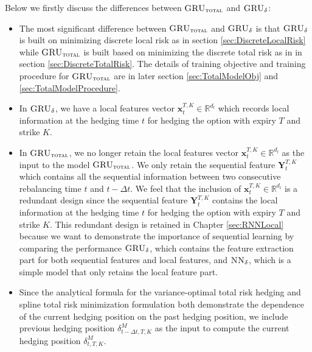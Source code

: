 \documentclass[letterpaper,12pt,titlepage,oneside,final]{book}
\numberwithin{equation}{section}
\theoremstyle{definition}
\newcommand{\model}{\textsc{GRU}_\delta}
\newcommand{\modelT}{\textsc{GRU}_{\textsc{total}}}
\newcommand{\modelN}{\textsc{NN}_\delta}
\newcommand{\vx}{\mathbf{x}}
\newcommand{\DT}{\Delta t}
\newcommand{\Real}{\mathbb{R}}
\begin{document}
Below we firstly discuss the differences between $\modelT$ and $\model$:
\begin{itemize}
	
	\item The most significant difference between  $\modelT$ and  $\model$ is that $\model$ is built on minimizing discrete local risk as in section \ref{sec:DiscreteLocalRisk} while $\modelT$ is built based on minimizing the discrete total risk as in in section \ref{sec:DiscreteTotalRisk}. The details of  training objective and training procedure for $\modelT$ are in later section \ref{sec:TotalModelObj} and \ref{sec:TotalModelProcedure}.
	\item In $\model$, we have a local features vector $\vx^{T,K}_{t} \in \Real^{d_l}$ which records local information at the hedging time $t$ for hedging the option with expiry $T$ and strike $K$.
	\item In $\modelT$, we no longer retain the local features vector $\vx^{T,K}_{t} \in \Real^{d_l}$ as the input to the model $\modelT$. We only retain the sequential feature  $\mathbf{Y}_{t}^{T,K}$ which contains all the sequential information between two consecutive rebalancing time $t$ and $t-\DT$. We feel that the inclusion of $\vx^{T,K}_{t} \in \Real^{d_l}$ is a redundant design since  the sequential feature  $\mathbf{Y}_{t}^{T,K}$ contains the local information at the hedging time $t$ for hedging the option with expiry $T$ and strike $K$. This redundant design is retained in Chapter \ref{sec:RNNLocal} because we want to demonstrate the importance of sequential learning by  comparing the performance $\model$, which contains the feature extraction part for both sequential features and local features, and $\modelN$, which is a simple model that only retains the local feature part.
	

	\item Since the analytical formula for the variance-optimal total risk hedging \cite{schweizer1995variance} and spline total risk minimization formulation \cite{coleman2007total} both  demonstrate the dependence of the current hedging position on the past hedging position, we include previous hedging position $\delta^{M}_{t-\Delta t,T,K}$ as the input to compute the current hedging position $\delta^{M}_{t,T,K}$. 
	
\end{itemize}
\end{document}
